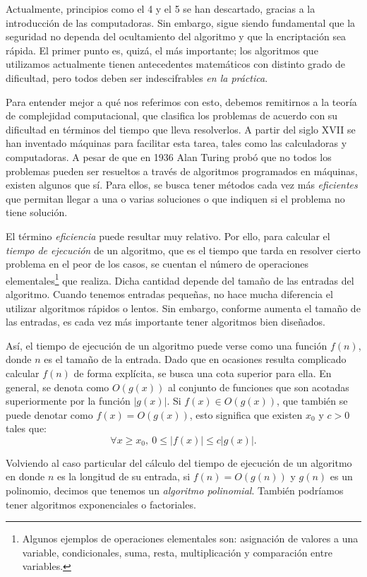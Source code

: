 Actualmente, principios como el 4 y el 5 se han descartado, gracias a la introducción de las computadoras. Sin embargo, sigue siendo fundamental que la seguridad no dependa del ocultamiento del algoritmo y que la encriptación sea rápida. El primer punto es, quizá, el más importante; los algoritmos que utilizamos actualmente tienen antecedentes matemáticos con distinto grado de dificultad, pero todos deben ser indescifrables \textit{en la práctica}. 

\bigskip Para entender mejor a qué nos referimos con esto, debemos remitirnos a la teoría de complejidad computacional, que clasifica los problemas de acuerdo con su dificultad en términos del tiempo que lleva resolverlos. A partir del siglo XVII se han inventado máquinas para facilitar esta tarea, tales como las calculadoras y computadoras. A pesar de que en 1936 Alan Turing probó que no todos los problemas pueden ser resueltos a través de algoritmos programados en máquinas, existen algunos que sí. Para ellos, se busca tener métodos cada vez más \textit{eficientes} que permitan llegar a una o varias soluciones o que indiquen si el problema no tiene solución. 

\bigskip El término \textit{eficiencia} puede resultar muy relativo. Por ello, para calcular el \textit{tiempo de ejecución} de un algoritmo, que es el tiempo que tarda en resolver cierto problema en el peor de los casos, se cuentan el número de operaciones elementales\footnote{Algunos ejemplos de operaciones elementales son: asignación de valores a una variable, condicionales, suma, resta, multiplicación y comparación entre variables.} que realiza. Dicha cantidad depende del tamaño de las entradas del algoritmo. Cuando tenemos entradas pequeñas, no hace mucha diferencia el utilizar algoritmos rápidos o lentos. Sin embargo, conforme aumenta el tamaño de las entradas, es cada vez más importante tener algoritmos bien diseñados. 

\bigskip Así, el tiempo de ejecución de un algoritmo puede verse como una función $f(n)$, donde $n$ es el tamaño de la entrada. Dado que en ocasiones resulta complicado calcular $f(n)$ de forma explícita, se busca una cota superior para ella. En general, se denota como $O(g(x))$ al conjunto de funciones que son acotadas superiormente por la función $\left|g(x)\right|$. Si $f(x)\in O(g(x))$, que también se puede denotar como $f(x)=O(g(x))$, esto significa que existen $x_0$ y $c>0$ tales que:
\[ \forall x\geq x_0, \ 0\leq \left|f(x)\right|\leq c\left|g(x)\right|.
\]

Volviendo al caso particular del cálculo del tiempo de ejecución de un algoritmo en donde $n$ es la longitud de su entrada, si $f(n)=O(g(n))$ y $g(n)$ es un polinomio, decimos que tenemos un \textit{algoritmo polinomial}. También podríamos tener algoritmos exponenciales o factoriales.

